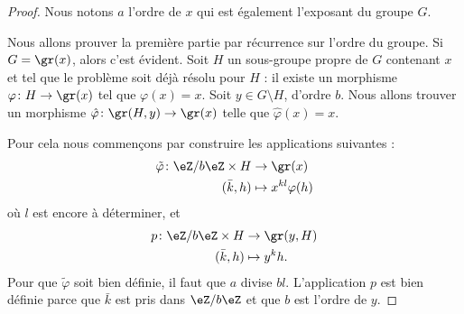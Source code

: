 \begin{proof}
    Nous notons \( a\) l'ordre de \( x\) qui est également l'exposant du groupe \( G\).

    Nous allons prouver la première partie par récurrence sur l'ordre du groupe. Si \( G=\gr(x)\), alors c'est évident. Soit \( H\) un sous-groupe propre de \( G\) contenant \( x\) et tel que le problème soit déjà résolu pour \( H\) : il existe un morphisme \( \varphi\colon H\to \gr(x)\) tel que \( \varphi(x)=x\). Soit \( y\in G\setminus H\), d'ordre \( b\). Nous allons trouver un morphisme $\hat\varphi\colon \gr(H,y)\to \gr(x) $ telle que \( \hat\varphi(x)=x\).

    Pour cela nous commençons par construire les applications suivantes :
    \begin{equation}
        \begin{aligned}
            \tilde \varphi\colon \eZ/b\eZ\times H&\to \gr(x) \\
            (\bar k,h)&\mapsto x^{kl}\varphi(h)
        \end{aligned}
    \end{equation}
    où \( l\) est encore à déterminer, et
    \begin{equation}
        \begin{aligned}
            p\colon \eZ/b\eZ\times H&\to \gr(y,H) \\
            (\bar k,h)&\mapsto y^kh.
        \end{aligned}
    \end{equation}
    Pour que \( \tilde \varphi\) soit bien définie, il faut que \( a\) divise \( bl\). L'application \( p\) est bien définie parce que \( \bar k\) est pris dans \( \eZ/b\eZ\) et que \( b\) est l'ordre de \( y\).


\end{proof}
